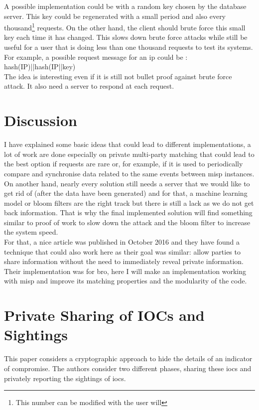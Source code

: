 \documentclass{eplmastersthesis}
\begin{document}
A possible implementation could be with a random key chosen by the database server. This key could be regenerated with a small period and also every thousand\footnote{This number can be modified with the user will} requests.
On the other hand, the client should brute force this small key each time it has changed. This slows down brute force attacks while still be useful for a user that is doing less than one thousand requests to test its systems.
For example, a possible request message for an \gls{ip} could be : hash(IP)||hash(IP||key)\\

The idea is interesting even if it is still not bullet proof against brute force attack. It also need a server to respond at each request.

\section{Discussion}
I have explained some basic ideas that could lead to different implementations, a lot of work are done especially on private multi-party matching that could lead to the best option if requests are rare or, for example, if it is used to periodically compare and synchronise data related to the same events between \gls{misp} instances.
On another hand, nearly every solution still needs a server that we would like to get rid of (after the data have been generated) and for that, a machine learning model or bloom filters are the right track but there is still a lack as we do not get back information. That is why the final implemented solution will find something similar to proof of work to slow down the attack and the bloom filter to increase the system speed.\\

For that, a nice article \cite{van2016private} was published in October 2016 and they have found a technique that could also work here as their goal was similar: allow parties to share information without the need to immediately reveal private information.
Their implementation was for bro, here I will make an implementation working with \gls{misp} and improve its matching properties and the modularity of the code. 

\section{Private Sharing of IOCs and Sightings \cite{van2016private}}
\label{sec:articlePrivate}
This paper considers a cryptographic approach to hide the details of an indicator of compromise. The authors consider two different phases, sharing these \gls{ioc}s and privately reporting the sightings of \gls{ioc}s.\\
\end{document}
